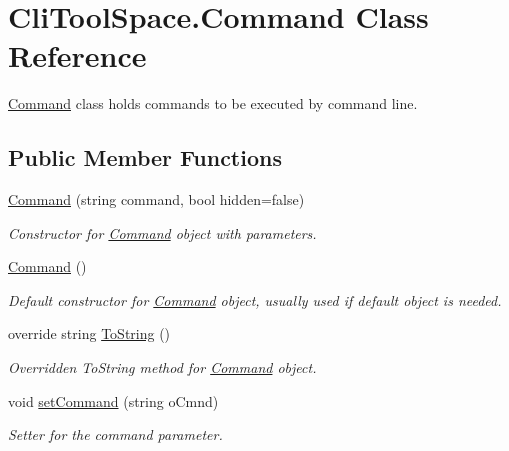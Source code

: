 \hypertarget{class_cli_tool_space_1_1_command}{}\section{Cli\+Tool\+Space.\+Command Class Reference}
\label{class_cli_tool_space_1_1_command}


\mbox{\hyperlink{class_cli_tool_space_1_1_command}{Command}} class holds commands to be executed by command line.  


\subsection*{Public Member Functions}
\begin{DoxyCompactItemize}
\item 
\mbox{\hyperlink{class_cli_tool_space_1_1_command_ab93496803937b79918c2a63b15df7e4b}{Command}} (string command, bool hidden=false)
\begin{DoxyCompactList}\small\item\em Constructor for \mbox{\hyperlink{class_cli_tool_space_1_1_command}{Command}} object with parameters. \end{DoxyCompactList}\item 
\mbox{\hyperlink{class_cli_tool_space_1_1_command_af62f9e2db8cd415370496f8dbec63b0e}{Command}} ()
\begin{DoxyCompactList}\small\item\em Default constructor for \mbox{\hyperlink{class_cli_tool_space_1_1_command}{Command}} object, usually used if default object is needed. \end{DoxyCompactList}\item 
override string \mbox{\hyperlink{class_cli_tool_space_1_1_command_a0eb86154a0dd76853a440baec69c406d}{To\+String}} ()
\begin{DoxyCompactList}\small\item\em Overridden To\+String method for \mbox{\hyperlink{class_cli_tool_space_1_1_command}{Command}} object. \end{DoxyCompactList}\item 
void \mbox{\hyperlink{class_cli_tool_space_1_1_command_a81c6eafab4f24091f8cb795b1bc50a17}{set\+Command}} (string o\+Cmnd)
\begin{DoxyCompactList}\small\item\em Setter for the command parameter. \end{DoxyCompactList}\item 

\end{DoxyCompactItemize}
